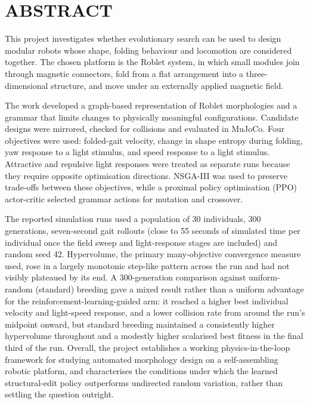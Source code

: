 \documentclass[12pt,a4paper]{report}
\begin{document}

\section*{ABSTRACT}
This project investigates whether evolutionary search can be used to design modular robots whose shape, folding behaviour and locomotion are considered together. The chosen platform is the Roblet system, in which small modules join through magnetic connectors, fold from a flat arrangement into a three-dimensional structure, and move under an externally applied magnetic field.

The work developed a graph-based representation of Roblet morphologies and a grammar that limits changes to physically meaningful configurations. Candidate designs were mirrored, checked for collisions and evaluated in MuJoCo. Four objectives were used: folded-gait velocity, change in shape entropy during folding, yaw response to a light stimulus, and speed response to a light stimulus. Attractive and repulsive light responses were treated as separate runs because they require opposite optimisation directions. NSGA-III was used to preserve trade-offs between these objectives, while a proximal policy optimisation (PPO) actor-critic selected grammar actions for mutation and crossover.

The reported simulation runs used a population of 30 individuals, 300 generations, seven-second gait rollouts (close to 55 seconds of simulated time per individual once the field sweep and light-response stages are included) and random seed 42. Hypervolume, the primary many-objective convergence measure used, rose in a largely monotonic step-like pattern across the run and had not visibly plateaued by its end. A 300-generation comparison against uniform-random (standard) breeding gave a mixed result rather than a uniform advantage for the reinforcement-learning-guided arm: it reached a higher best individual velocity and light-speed response, and a lower collision rate from around the run's midpoint onward, but standard breeding maintained a consistently higher hypervolume throughout and a modestly higher scalarised best fitness in the final third of the run. Overall, the project establishes a working physics-in-the-loop framework for studying automated morphology design on a self-assembling robotic platform, and characterises the conditions under which the learned structural-edit policy outperforms undirected random variation, rather than settling the question outright.
\end{document}
